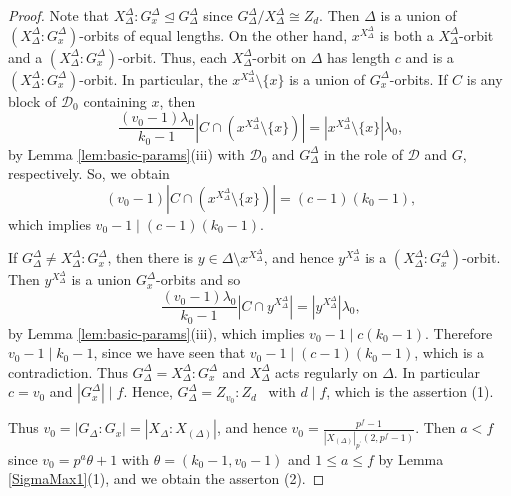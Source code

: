 \documentclass[10pt,a4paper]{amsart}
\renewcommand{\leq}{\leqslant}
\begin{document}
\begin{proof}
Note that $X_{\Delta
}^{\Delta }:G_{x}^{\Delta }\trianglelefteq G_{\Delta }^{\Delta }$ since $G_{\Delta }^{\Delta }/X_{\Delta }^{\Delta }\cong Z_{d}$. Then $\Delta $ is a
union of $(X_{\Delta }^{\Delta }:G_{x}^{\Delta })$-orbits of equal lengths.
On the other hand, $x^{X_{\Delta }^{\Delta }}$ is both a $X_{\Delta
}^{\Delta }$-orbit and a $(X_{\Delta }^{\Delta }:G_{x}^{\Delta })$-orbit.
Thus, each $X_{\Delta }^{\Delta }$-orbit on $\Delta $ has length $c$ and is a $(X_{\Delta
}^{\Delta }:G_{x}^{\Delta })$-orbit. In particular, the $x^{X_{\Delta
}^{\Delta }}\setminus \{x\}$ is a union of $G_{x}^{\Delta }$-orbits. If $C$
is any block of $\mathcal{D}_{0}$ containing $x$, then 
\begin{equation*}
\frac{\left( v_{0}-1\right) \lambda _{0}}{k_{0}-1}\left\vert C\cap
(x^{X_{\Delta }^{\Delta }}\setminus \{x\})\right\vert =\left\vert
x^{X_{\Delta }^{\Delta }}\setminus \{x\}\right\vert \lambda _{0}\text{,}
\end{equation*}
by Lemma \ref{lem:basic-params}(iii) with $\mathcal{D}_{0}$ and $G_{\Delta }^{\Delta }$ in the role of $\mathcal{D}$ and $G$, respectively. So, we obtain 
$$\left( v_{0}-1\right) \left\vert C\cap (x^{X_{\Delta }^{\Delta }}\setminus
\{x\})\right\vert =(c-1)(k_{0}-1)\text{,}$$
which implies $v_{0}-1 \mid (c-1)(k_{0}-1)$.

If $G_{\Delta }^{\Delta }\neq X_{\Delta }^{\Delta
}:G_{x}^{\Delta }$, then there is $y\in \Delta \setminus x^{X_{\Delta
}^{\Delta }}$, and hence $y^{X_{\Delta }^{\Delta }}$ is a $(X_{\Delta
}^{\Delta }:G_{x}^{\Delta })$-orbit. Then $y^{X_{\Delta }^{\Delta }}$ is a
union $G_{x}^{\Delta }$-orbits and so%
\begin{equation*}
\frac{\left( v_{0}-1\right) \lambda _{0}}{k_{0}-1}\left\vert C\cap
y^{X_{\Delta }^{\Delta }}\right\vert =\left\vert y^{X_{\Delta }^{\Delta
}}\right\vert \lambda _{0}\text{,}
\end{equation*}%
by Lemma \ref{lem:basic-params}(iii), which implies $v_{0}-1 \mid c(k_{0}-1)$. Therefore $v_{0}-1\mid k_{0}-1$, since we have seen that $v_{0}-1 \mid (c-1)(k_{0}-1)$, which is a contradiction. Thus $%
G_{\Delta }^{\Delta }=X_{\Delta }^{\Delta }:G_{x}^{\Delta }$ and $X_{\Delta
}^{\Delta }$ acts regularly on $\Delta $. In particular $c=v_{0}$ and $%
\left\vert G_{x}^{\Delta }\right\vert \mid f$. Hence, $G_{\Delta }^{\Delta
}=Z_{v_{0}}:Z_{d}$ \ with $d\mid f$, which is the assertion (1).

Thus $v_{0}=\left\vert G_{\Delta }:G_{x}\right\vert=\left\vert X_{\Delta }:X_{(\Delta )}\right\vert $, and hence $v_{0}=\frac{p^{f}-1}{\left\vert X_{(\Delta)}\right\vert _{p^{\prime }}(2,p^{f}-1)}$. Then $a<f$ since $v_{0}=p^{a}\theta+1$ with $\theta =\left( k_{0}-1,v_{0}-1\right)$ and $1\leq a \leq f$ by Lemma \ref{SigmaMax1}(1), and we obtain the asserton (2). 
\end{proof}
\end{document}

